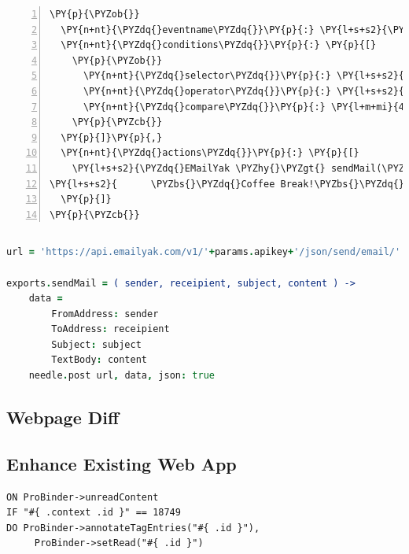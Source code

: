 \begin{Verbatim}[samepage=true,frame=single,fontsize=\footnotesize,commandchars=\\\{\},numbers=left,firstnumber=1,stepnumber=1,xleftmargin
=.3in]
\PY{p}{\PYZob{}}
  \PY{n+nt}{\PYZdq{}eventname\PYZdq{}}\PY{p}{:} \PY{l+s+s2}{\PYZdq{}uptimestatistics\PYZdq{}}\PY{p}{,}
  \PY{n+nt}{\PYZdq{}conditions\PYZdq{}}\PY{p}{:} \PY{p}{[}
    \PY{p}{\PYZob{}}
      \PY{n+nt}{\PYZdq{}selector\PYZdq{}}\PY{p}{:} \PY{l+s+s2}{\PYZdq{}.currentlyon\PYZdq{}}\PY{p}{,}
      \PY{n+nt}{\PYZdq{}operator\PYZdq{}}\PY{p}{:} \PY{l+s+s2}{\PYZdq{}\PYZgt{}\PYZdq{}}\PY{p}{,}
      \PY{n+nt}{\PYZdq{}compare\PYZdq{}}\PY{p}{:} \PY{l+m+mi}{42}
    \PY{p}{\PYZcb{}}
  \PY{p}{]}\PY{p}{,}
  \PY{n+nt}{\PYZdq{}actions\PYZdq{}}\PY{p}{:} \PY{p}{[}
    \PY{l+s+s2}{\PYZdq{}EMailYak \PYZhy{}\PYZgt{} sendMail(\PYZbs{}\PYZdq{}eca\PYZhy{}engine@mscliveweb.simpleyak.com\PYZbs{}\PYZdq{},[usermaillist],}
\PY{l+s+s2}{      \PYZbs{}\PYZdq{}Coffee Break!\PYZbs{}\PYZdq{},\PYZbs{}\PYZdq{}Let\PYZsq{}s go for a coffee at 10!\PYZbs{}\PYZdq{})\PYZdq{}}
  \PY{p}{]}
\PY{p}{\PYZcb{}}
\end{Verbatim}
\vspace{-0.7cm}
\begin{lstlisting}[float=h,language=OwnRule,caption={Rule; Coffee Break Invitation},label={lst:ruleCoffeeBreak},frame=no]
\end{lstlisting}

\begin{lstlisting}[float=h,language=CoffeeScript,caption={Action Dispatcher; EMailYak, in CoffeeScript},label={lst:adEmailYak}]
url = 'https://api.emailyak.com/v1/'+params.apikey+'/json/send/email/'

exports.sendMail = ( sender, receipient, subject, content ) ->
	data =
		FromAddress: sender
		ToAddress: receipient
		Subject: subject
		TextBody: content
	needle.post url, data, json: true
\end{lstlisting}


\subsection{Webpage Diff}




\subsection{Enhance Existing Web App}

\begin{lstlisting}[float=h,language=OwnRule,label={lst:RulePhraseAnnotate},caption=Rule Phrase for ProBinder Annotations]
ON ProBinder->unreadContent
IF "#{ .context .id }" == 18749
DO ProBinder->annotateTagEntries("#{ .id }"),
	 ProBinder->setRead("#{ .id }")
\end{lstlisting}


